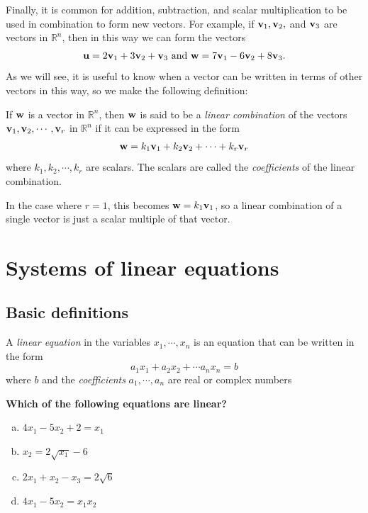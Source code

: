 \documentclass[12pt,letterpaper,reqno]{article}
\numberwithin{equation}{section}
\newcommand{\ti}[1]{\textit{#1}}
\newcommand{\fixme}[1]{{\color{orange}{[#1]}}}
\begin{document}
Finally, it is common for addition, subtraction, and scalar multiplication to be used in combination to form new vectors. For example, if ${\bf v}_1, {\bf v}_2,$ and ${\bf v}_3$ are vectors in $\mathbb{R}^n$, then in this way we can form the vectors
\begin{align*}
	{\bf u}=2{\bf v}_1+3{\bf v}_2+{\bf v}_3 \text{ and } {\bf w}=7{\bf v}_1-6{\bf v}_2+8{\bf v}_3.
\end{align*}
As we will see, it is useful to know when a vector can be written in terms of other vectors in this way, so we make the following definition:

\begin{defn}
	If ${\bf w}$ is a vector in $\mathbb{R}^n$, then ${\bf w}$ is said to be a \ti{linear combination} of the vectors ${\bf v}_1, {\bf v}_2, \cdots, {\bf v}_r$ in $\mathbb{R}^n$ if it can be expressed in the form
	\begin{align*}
		{\bf w}=k_1{\bf v}_1+k_2{\bf v}_2+\cdots +k_r{\bf v}_r
	\end{align*}
	where $k_1,k_2,\cdots,k_r$ are scalars. The scalars are called the \ti{coefficients} of the linear combination.
	
	In the case where $r=1$, this becomes ${\bf w}=k_1{\bf v}_1$, so a linear combination of a single vector is just a scalar multiple of that vector.
\end{defn}


\section{Systems of linear equations}
\fixme{Refer to point-normal equations of lines and planes from the slides as geometric motivation  for this section.}
\subsection{Basic definitions}
\begin{defn}\label{def:linear_equation}
	A \ti{linear equation} in the variables $x_1,\cdots, x_n$ is an equation that can be written in the form
\begin{equation}
	a_1 x_1+a_2 x_2+\cdots a_n x_n=b
\end{equation}
where $b$ and the \ti{coefficients} $a_1,\cdots, a_n$ are real or complex numbers	
\end{defn}

\begin{exercise}
\bf Which of the following equations are linear?
\begin{enumerate}[(a)]
	\item $4x_1-5x_2+2=x_1$
	\item $x_2=2\sqrt{x_1}-6$
	\item $2x_1+x_2-x_3=2\sqrt{6}$ 
	\item $4x_1-5x_2=x_1x_2$ 
\end{enumerate}
\end{exercise}
\end{document}

